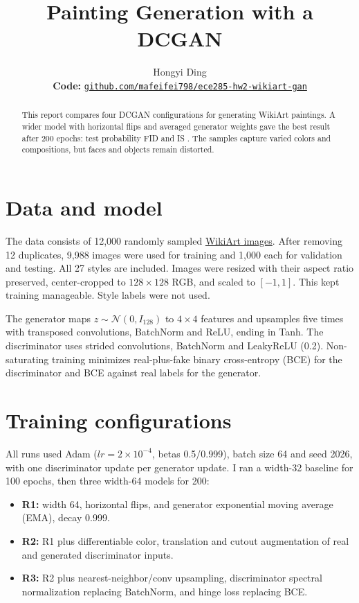 \documentclass{article}
\title{Painting Generation with a DCGAN}
\author{Hongyi Ding \quad {\normalfont UC San Diego}\\
{\footnotesize\textbf{Code: }\href{https://github.com/mafeifei798/ece285-hw2-wikiart-gan}{\nolinkurl{github.com/mafeifei798/ece285-hw2-wikiart-gan}}}}
\begin{document}
\maketitle
\begin{abstract}
This report compares four DCGAN configurations for generating WikiArt paintings.
A wider model with horizontal flips and averaged generator weights gave the best
result after 200 epochs: test probability FID \TestFID{} and IS \TestIS{}.
The samples capture varied colors and compositions, but faces and objects remain distorted.
\end{abstract}

\section{Data and model}
The data consists of 12,000 randomly sampled \href{https://www.kaggle.com/datasets/steubk/wikiart}{WikiArt images}.
After removing 12 duplicates, 9,988 images were used for training and 1,000 each
for validation and testing. All 27 styles are included. Images were resized
with their aspect ratio preserved, center-cropped to $128\times128$ RGB, and
scaled to $[-1,1]$. This kept training manageable. Style labels were not used.

The generator maps $z\sim\mathcal N(0,I_{128})$ to $4\times4$ features and upsamples
five times with transposed convolutions, BatchNorm and ReLU, ending in Tanh.
The discriminator uses strided convolutions, BatchNorm and LeakyReLU (0.2).
Non-saturating training minimizes real-plus-fake binary cross-entropy (BCE)
for the discriminator and BCE against real labels for the generator.

\section{Training configurations}
All runs used Adam ($lr=2\times10^{-4}$, betas 0.5/0.999), batch size 64 and
seed 2026, with one discriminator update per generator update.
I ran a width-32 baseline for 100 epochs, then three width-64 models for 200:
\begin{itemize}
\setlength\itemsep{0pt}
\item \textbf{R1:} width 64, horizontal flips, and generator exponential moving
average (EMA), decay 0.999.
\item \textbf{R2:} R1 plus differentiable color, translation and cutout augmentation
of real and generated discriminator inputs.
\item \textbf{R3:} R2 plus nearest-neighbor/conv upsampling, discriminator spectral
normalization replacing BatchNorm, and hinge loss replacing BCE.
\end{itemize}
\end{document}
